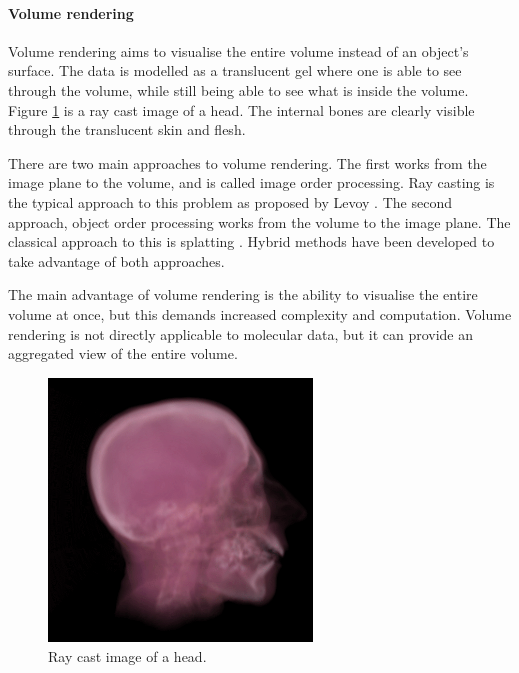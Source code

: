 
\paragraph{Volume rendering}

Volume rendering aims to visualise the entire volume instead of an object's
surface. The data is modelled as a translucent gel where one is able to see
through the volume, while still being able to see what is inside the volume.
Figure \ref{fig:background_head} is a ray cast image of a head. The internal
bones are clearly visible through the translucent skin and flesh.

There are two main approaches to volume rendering. The first works from the
image plane to the volume, and is called image order processing. Ray casting is
the typical approach to this problem as proposed by Levoy \citep{levoy88}. The
second approach, object order processing works from the volume to the image
plane. The classical approach to this is splatting \citep{westover89}. Hybrid
methods have been developed to take advantage of both approaches.

The main advantage of volume rendering is the ability to visualise the entire
volume at once, but this demands increased complexity and computation. Volume
rendering is not directly applicable to molecular data, but it can provide an
aggregated view of the entire volume.

\begin{figure}
  \begin{center}
    \includegraphics[width=70mm]{head_volume}
  \end{center}
  \caption{Ray cast image of a head.}
  \label{fig:background_head}
\end{figure}


